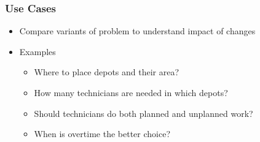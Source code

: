 
\begin{frame}
\frametitle{Use Cases}
\begin{itemize}
\item Compare variants of problem to understand impact of changes
\item Examples
\begin{itemize}
\item Where to place depots and their area? 
\item How many technicians are needed in which depots?
\item Should technicians do both planned and unplanned work?
\item When is overtime the better choice?
\end{itemize}
\end{itemize}
\end{frame}





